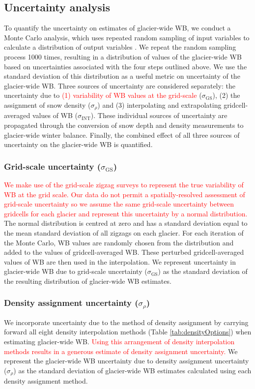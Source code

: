 \documentclass[twocolumn, letterpaper]{igs}
\begin{document}
\subsection{Uncertainty analysis}

To quantify the uncertainty on estimates of glacier-wide WB, we conduct a Monte Carlo analysis, which uses repeated random sampling of input variables to calculate a distribution of output variables \citep{Metropolis1949}. We repeat the random sampling process 1000 times, resulting in a distribution of values of the glacier-wide WB based on uncertainties associated with the four steps outlined above. We use the standard deviation of this distribution as a useful metric on uncertainty of the glacier-wide WB. Three sources of uncertainty are considered separately: the uncertainty due to \textcolor{red}{(1) variability of WB values at the grid-scale} ($\sigma_{\mathrm{GS}}$), (2) the assignment of snow density ($\sigma_{\rho}$) and (3) interpolating and extrapolating gridcell-averaged values of WB ($\sigma_{\mathrm{INT}}$). These individual sources of uncertainty are propagated through the conversion of snow depth and density measurements to glacier-wide winter balance. Finally, the combined effect of all three sources of uncertainty on the glacier-wide WB is quantified.

	\subsubsection{Grid-scale uncertainty ($\sigma_{\mathrm{GS}}$)}
\textcolor{red}{We make use of the grid-scale zigzag surveys to represent the true variability of WB at the grid scale. Our data do not permit a spatially-resolved assessment of grid-scale uncertainty so we assume the same grid-scale uncertainty between gridcells for each glacier and represent this uncertainty by a normal distribution. }The normal distribution is centred at zero and has a standard deviation equal to the mean standard deviation of all zigzags on each glacier. For each iteration of the Monte Carlo, WB values are randomly chosen from the distribution and added to the values of gridcell-averaged WB. These perturbed gridcell-averaged values of WB are then used in the interpolation. We represent uncertainty in glacier-wide WB due to grid-scale uncertainty ($\sigma_{\mathrm{GS}}$) as the standard deviation of the resulting distribution of glacier-wide WB estimates.  

	\subsubsection{Density assignment uncertainty ($\sigma_{\rho}$)}
We incorporate uncertainty due to the method of density assignment by carrying forward all eight density interpolation methods (Table \ref{tab:densityOptions}) when estimating glacier-wide WB. \textcolor{red}{Using this arrangement of density interpolation methods results in a generous estimate of density assignment uncertainty.} We represent the glacier-wide WB uncertainty due to density assignment uncertainty ($\sigma_{\rho}$) as the standard deviation of glacier-wide WB estimates calculated using each density assignment method.
\end{document}
